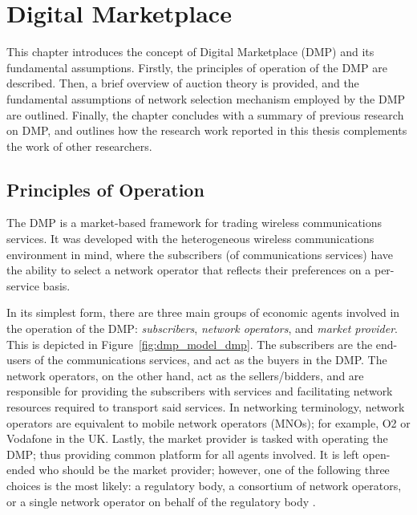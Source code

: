 \chapter{Digital Marketplace} %
\label{cha:dmp}

This chapter introduces the concept of Digital Marketplace (DMP) and its fundamental assumptions. Firstly, the principles of operation of the DMP are described. Then, a brief overview of auction theory is provided, and the fundamental assumptions of network selection mechanism employed by the DMP are outlined. Finally, the chapter concludes with a summary of previous research on DMP, and outlines how the research work reported in this thesis complements the work of other researchers.

\section{Principles of Operation} %
\label{sec:principles_of_operation_dmp}
The DMP is a market-based framework for trading wireless communications services. It was developed with the heterogeneous wireless communications environment in mind, where the subscribers (of communications services) have the ability to select a network operator that reflects their preferences on a per-service basis.

In its simplest form, there are three main groups of economic agents involved in the operation of the DMP: \emph{subscribers}, \emph{network operators}, and \emph{market provider}. This is depicted in Figure~\ref{fig:dmp_model_dmp}. The subscribers are the end-users of the communications services, and act as the buyers in the DMP. The network operators, on the other hand, act as the sellers/bidders, and are responsible for providing the subscribers with services and facilitating network resources required to transport said services. In networking terminology, network operators are equivalent to mobile network operators (MNOs); for example, O2 or Vodafone in the UK. Lastly, the market provider is tasked with operating the DMP; thus providing common platform for all agents involved. It is left open-ended who should be the market provider; however, one of the following three choices is the most likely: a regulatory body, a consortium of network operators, or a single network operator on behalf of the regulatory body \cite{DMLeBodic00,DMIrvine02}.

